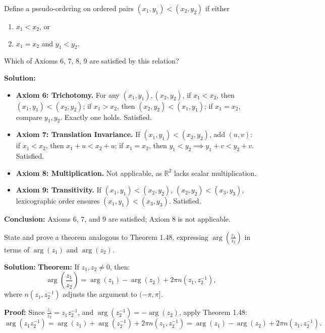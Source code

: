 \begin{problembox}
Define a pseudo-ordering on ordered pairs \((x_1, y_1) < (x_2, y_2)\) if either
\begin{enumerate}[label=(\roman*)]
\item \(x_1 < x_2\), or
\item \(x_1 = x_2\) and \(y_1 < y_2\).
\end{enumerate}
Which of Axioms 6, 7, 8, 9 are satisfied by this relation?
\end{problembox}

\textbf{Solution:}
\begin{itemize}
\item \textbf{Axiom 6: Trichotomy.} For any \( (x_1, y_1), (x_2, y_2) \), if \( x_1 < x_2 \), then \( (x_1, y_1) < (x_2, y_2) \); if \( x_1 > x_2 \), then \( (x_2, y_2) < (x_1, y_1) \); if \( x_1 = x_2 \), compare \( y_1, y_2 \). Exactly one holds. Satisfied.
\item \textbf{Axiom 7: Translation Invariance.} If \( (x_1, y_1) < (x_2, y_2) \), add \( (u, v) \): if \( x_1 < x_2 \), then \( x_1 + u < x_2 + u \); if \( x_1 = x_2 \), then \( y_1 < y_2 \implies y_1 + v < y_2 + v \). Satisfied.
\item \textbf{Axiom 8: Multiplication.} Not applicable, as \( \mathbb{R}^2 \) lacks scalar multiplication.
\item \textbf{Axiom 9: Transitivity.} If \( (x_1, y_1) < (x_2, y_2) \), \( (x_2, y_2) < (x_3, y_3) \), lexicographic order ensures \( (x_1, y_1) < (x_3, y_3) \). Satisfied.
\end{itemize}
\textbf{Conclusion:} Axioms 6, 7, and 9 are satisfied; Axiom 8 is not applicable.

\begin{problembox}
State and prove a theorem analogous to Theorem 1.48, expressing \( \arg\left( \frac{z_1}{z_2} \right) \) in terms of \( \arg(z_1) \) and \( \arg(z_2) \).
\end{problembox}

\textbf{Solution:}
\textbf{Theorem:} If \( z_1, z_2 \neq 0 \), then:
\[
\arg\left( \frac{z_1}{z_2} \right) = \arg(z_1) - \arg(z_2) + 2\pi n(z_1, z_2^{-1}),
\]
where \( n(z_1, z_2^{-1}) \) adjusts the argument to \( (-\pi, \pi] \).

\textbf{Proof:}
Since \( \frac{z_1}{z_2} = z_1 z_2^{-1} \), and \( \arg(z_2^{-1}) = -\arg(z_2) \), apply Theorem 1.48:
\[
\arg(z_1 z_2^{-1}) = \arg(z_1) + \arg(z_2^{-1}) + 2\pi n(z_1, z_2^{-1}) = \arg(z_1) - \arg(z_2) + 2\pi n(z_1, z_2^{-1}).
\]

